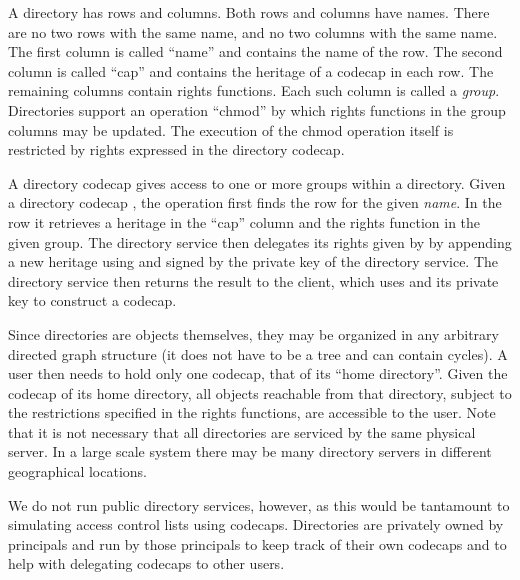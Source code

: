 \documentclass[10pt, conference, compsocconf]{IEEEtran}
\begin{document}
A directory has rows and columns.  Both rows and columns have names.
There are no two rows with the same name, and no two columns with
the same name.  The first column is called ``name'' and contains
the name of the row.  The second column is called ``cap'' and
contains the heritage of a codecap in each row. The remaining columns
contain rights functions.  Each such column is called a \emph{group}.
Directories support an operation ``chmod'' by which rights functions
in the group columns may be updated.
The execution of the chmod operation itself is restricted by rights
expressed in the directory codecap.

A directory codecap gives access to one or more groups within a directory.
Given a directory codecap ,
the operation 
first finds the row for the given \textit{name}.
In the row it retrieves a heritage  in the ``cap'' column and the rights
function  in the given group.
The directory service then delegates its rights given by  by
appending a new heritage  using  and signed by the private
key of the directory service.
The directory service then returns the result to the
client, which uses  and its private key to construct a codecap.

Since directories are objects themselves, they may be organized in
any arbitrary directed graph structure (it does not have to be a tree
and can contain cycles).  A user then needs to hold
only one codecap, that of its ``home directory''. Given the codecap
of its home directory, all objects reachable from that directory,
subject to the restrictions specified in the rights functions, are
accessible to the user.  Note that it is not necessary that all
directories are serviced by the same physical server.  In a large
scale system there may be many directory servers in different
geographical locations.


We do not run public directory services, however, as this would
be tantamount to simulating access control lists using codecaps.
Directories are privately owned by principals and run by those
principals to keep track of their own codecaps and to help
with delegating codecaps to other users.

\begin{comment}
For ease of use, it may in fact be convenient to structure the
directory graph itself into a tree, much like a Unix directory
graph.  Each directory would have a ``..'' row containing the
codecap of the parent directory.  Directories would have ``owner'',
``group'', and ``other'' columns.
\end{comment}
\end{document}
